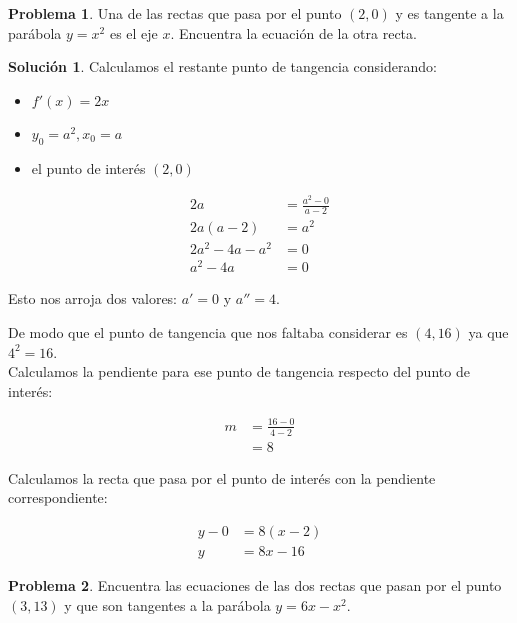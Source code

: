 \documentclass{article}
\theoremstyle{definition}
\newtheorem{problem}{Problema}
\newtheorem*{solution}{Solución}
\begin{document}
\bigskip

\begin{problem}
Una de las rectas que pasa por el punto \((2,0)\) y es tangente a la parábola \( y = x^2 \) es el eje \( x \). Encuentra la ecuación de la otra recta.
\end{problem}

\begin{solution}
Calculamos  el restante punto de tangencia considerando:

\begin{itemize}
    \item \( f'(x) = 2x \)
    \item \( y_0=a^2, x_0=a\)
    \item el punto de interés \( (2, 0) \)
\end{itemize}

\begin{align*}
    2a &= \frac{a^2-0}{a-2} \\
    2a(a-2) &= a^2 \\
    2a^2 - 4a - a^2 &= 0 \\
    a^2 - 4a &= 0
\end{align*}

Esto nos arroja dos valores: \( a' = 0 \) y \( a'' = 4 \). 

De modo que el punto de tangencia que nos faltaba considerar es \( (4, 16) \) ya que \( 4^2 = 16 \). \\

Calculamos la pendiente para ese punto de tangencia respecto del punto de interés:

\begin{align*}
    m &= \frac{16-0}{4-2} \\
    &= 8
\end{align*}

Calculamos la recta que pasa por el punto de interés con la pendiente correspondiente:

\begin{align*}
    y - 0 &= 8(x-2) \\
    y &= 8x - 16
\end{align*}
\end{solution}

\bigskip

\begin{problem}
Encuentra las ecuaciones de las dos rectas que pasan por el punto \((3,13)\) y que son tangentes a la parábola \( y = 6x - x^2 \).
\end{problem}
\end{document}
